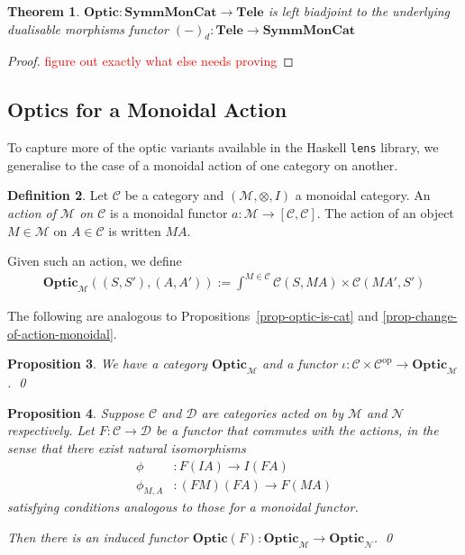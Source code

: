 \documentclass[11pt,a4paper]{article}
\theoremstyle{plain}
\newtheorem{theorem}{Theorem}[subsection]
\newtheorem{proposition}[theorem]{Proposition}
\theoremstyle{definition}
\newtheorem{definition}[theorem]{Definition}
\newcommand{\C}{\mathscr{C}}
\newcommand{\D}{\mathscr{D}}
\newcommand{\M}{\mathscr{M}}
\newcommand{\N}{\mathscr{N}}
\newcommand{\lenslib}{\texttt{lens}}
\newcommand{\SymmMonCat}{\mathbf{SymmMonCat}}
\newcommand{\Tele}{\mathbf{Tele}}
\newcommand{\Optic}{\mathbf{Optic}}
\newcommand{\op}{\mathrm{op}}
\newcommand{\todo}[1]{\textcolor{red}{\small #1}}
\begin{document}
\begin{theorem}
$\Optic : \SymmMonCat \to \Tele$ is left biadjoint to the underlying dualisable morphisms functor ${(-)}_d : \Tele \to \SymmMonCat$
\end{theorem}
\begin{proof}
\todo{figure out exactly what else needs proving}
\end{proof}

\subsection{Optics for a Monoidal Action}

To capture more of the optic variants available in the Haskell \lenslib{} library, we generalise to the case of a monoidal action of one category on another.

\begin{definition}
  Let $\C$ be a category and $(\M, \otimes, I)$ a monoidal category. An \emph{action of $\M$ on $\C$} is a monoidal functor $a : \M \to [\C, \C]$. The action of an object $M \in \M$ on $A \in \C$ is written $MA$.
\end{definition}

Given such an action, we define
\begin{align*}
  \Optic_\M((S, S'), (A, A')) := \int^{M \in \C} \C(S, MA) \times \C(MA', S')
\end{align*}

The following are analogous to Propositions~\ref{prop-optic-is-cat} and \ref{prop-change-of-action-monoidal}.

\begin{proposition}
  We have a category $\Optic_\M$ and a functor $\iota : \C \times \C^\op \to \Optic_\M$. \qed
\end{proposition}

\begin{proposition}\label{prop-change-of-action}
  Suppose $\C$ and $\D$ are categories acted on by $\M$ and $\mathcal{N}$ respectively. Let $F : \C \to \D$ be a functor that commutes with the actions, in the sense that there exist natural isomorphisms
  \begin{align*}
  \phi &: F(IA) \to I(FA) \\
  \phi_{M,A} &: (FM)(FA) \to F(MA)
  \end{align*}
satisfying conditions analogous to those for a monoidal functor.
  
Then there is an induced functor $\Optic(F) : \Optic_\M \to \Optic_\N$. \qed
\end{proposition}
\end{document}
